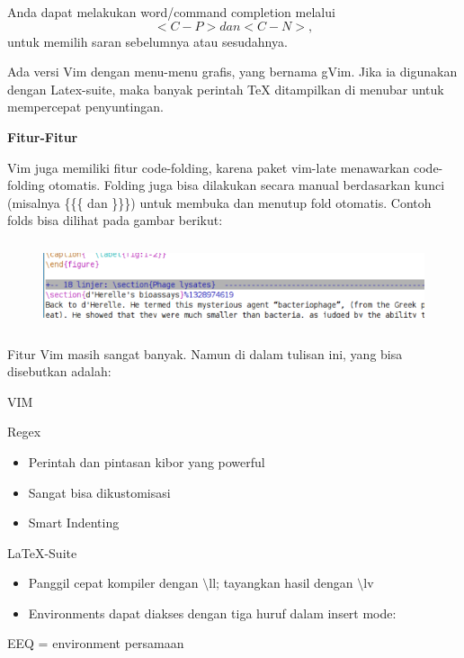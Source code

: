 \begin{enumerate}
Anda dapat melakukan word/command completion melalui
\begin{equation}
<C-P> dan <C-N>,
\end{equation}untuk memilih saran sebelumnya atau sesudahnya.

Ada versi Vim dengan menu-menu grafis, yang bernama gVim. Jika ia digunakan dengan Latex-suite, maka banyak perintah TeX ditampilkan di menubar untuk mempercepat penyuntingan.
\par \vspace{12pt}
\textbf{Fitur-Fitur}
\par \vspace{12pt}
Vim juga memiliki fitur code-folding, karena paket vim-late menawarkan code-folding otomatis. Folding juga bisa dilakukan secara manual berdasarkan kunci (misalnya \{\{\{ dan \}\}\}) untuk membuka dan menutup fold otomatis. Contoh folds bisa dilihat pada gambar berikut:

\begin{figure}[ht]

\includegraphics[width=15.12cm,height=2.54cm]{gambar/image5.jpg}
\end{figure}

Fitur Vim masih sangat banyak. Namun di dalam tulisan ini, yang bisa disebutkan adalah:

VIM

Regex

\begin{itemize}
\item Perintah dan pintasan kibor yang powerful
\item Sangat bisa dikustomisasi
\item Smart Indenting
\end{itemize}
LaTeX-Suite

\begin{itemize}
\item Panggil cepat kompiler dengan $\setminus$ll; tayangkan hasil dengan $\setminus$lv
\item Environments dapat diakses dengan tiga huruf dalam insert mode:
\end{itemize}
\hspace{0,2in}EEQ = environment persamaan


\end{enumerate}
